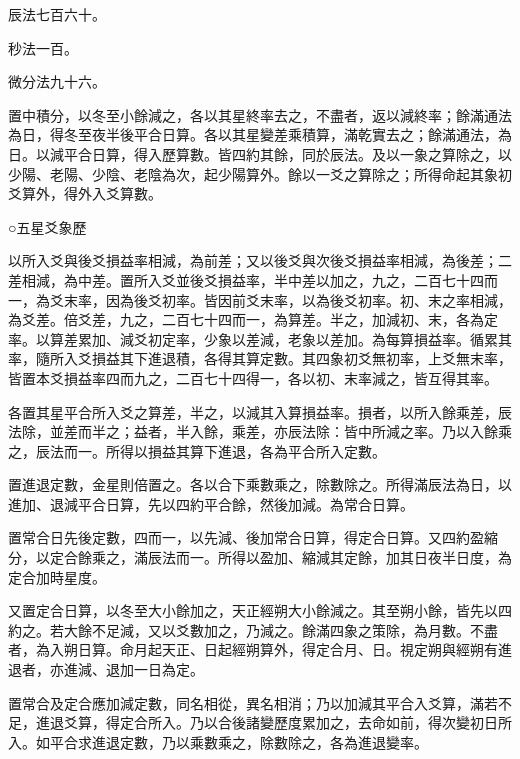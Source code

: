 \begin{pinyinscope}
 辰法七百六十。



 秒法一百。



 微分法九十六。



 置中積分，以冬至小餘減之，各以其星終率去之，不盡者，返以減終率；餘滿通法為日，得冬至夜半後平合日算。各以其星變差乘積算，滿乾實去之；餘滿通法，為日。以減平合日算，得入歷算數。皆四約其餘，同於辰法。及以一象之算除之，以少陽、老陽、少陰、老陰為次，起少陽算外。餘以一爻之算除之；所得命起其象初爻算外，得外入爻算數。



 ○五星爻象歷



 以所入爻與後爻損益率相減，為前差；又以後爻與次後爻損益率相減，為後差；二差相減，為中差。置所入爻並後爻損益率，半中差以加之，九之，二百七十四而一，為爻末率，因為後爻初率。皆因前爻末率，以為後爻初率。初、末之率相減，為爻差。倍爻差，九之，二百七十四而一，為算差。半之，加減初、末，各為定率。以算差累加、減爻初定率，少象以差減，老象以差加。為每算損益率。循累其率，隨所入爻損益其下進退積，各得其算定數。其四象初爻無初率，上爻無末率，皆置本爻損益率四而九之，二百七十四得一，各以初、末率減之，皆互得其率。



 各置其星平合所入爻之算差，半之，以減其入算損益率。損者，以所入餘乘差，辰法除，並差而半之；益者，半入餘，乘差，亦辰法除：皆中所減之率。乃以入餘乘之，辰法而一。所得以損益其算下進退，各為平合所入定數。



 置進退定數，金星則倍置之。各以合下乘數乘之，除數除之。所得滿辰法為日，以進加、退減平合日算，先以四約平合餘，然後加減。為常合日算。



 置常合日先後定數，四而一，以先減、後加常合日算，得定合日算。又四約盈縮分，以定合餘乘之，滿辰法而一。所得以盈加、縮減其定餘，加其日夜半日度，為定合加時星度。



 又置定合日算，以冬至大小餘加之，天正經朔大小餘減之。其至朔小餘，皆先以四約之。若大餘不足減，又以爻數加之，乃減之。餘滿四象之策除，為月數。不盡者，為入朔日算。命月起天正、日起經朔算外，得定合月、日。視定朔與經朔有進退者，亦進減、退加一日為定。



 置常合及定合應加減定數，同名相從，異名相消；乃以加減其平合入爻算，滿若不足，進退爻算，得定合所入。乃以合後諸變歷度累加之，去命如前，得次變初日所入。如平合求進退定數，乃以乘數乘之，除數除之，各為進退變率。




\end{pinyinscope}
